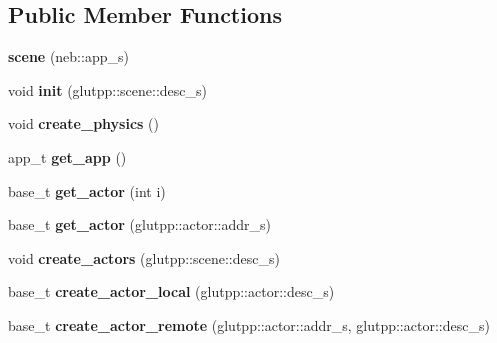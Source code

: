 \subsection*{Public Member Functions}
\begin{DoxyCompactItemize}
\item 
\hypertarget{classneb_1_1scene_1_1scene_abccb582576f45ce1b923bf6b6a153da6}{
{\bfseries scene} (neb::app\_\-s)}
\label{classneb_1_1scene_1_1scene_abccb582576f45ce1b923bf6b6a153da6}

\item 
\hypertarget{classneb_1_1scene_1_1scene_a44f7744f9e07ad6a8722689b3f8392b4}{
void {\bfseries init} (glutpp::scene::desc\_\-s)}
\label{classneb_1_1scene_1_1scene_a44f7744f9e07ad6a8722689b3f8392b4}

\item 
\hypertarget{classneb_1_1scene_1_1scene_a86d094b5dfff986da693d385c0f0f245}{
void {\bfseries create\_\-physics} ()}
\label{classneb_1_1scene_1_1scene_a86d094b5dfff986da693d385c0f0f245}

\item 
\hypertarget{classneb_1_1scene_1_1scene_a4a18d76291ad008be51b7fb8b22f1451}{
app\_\-t {\bfseries get\_\-app} ()}
\label{classneb_1_1scene_1_1scene_a4a18d76291ad008be51b7fb8b22f1451}

\item 
\hypertarget{classneb_1_1scene_1_1scene_a2d1b083bbbd21c78884713ae1b653ac7}{
base\_\-t {\bfseries get\_\-actor} (int i)}
\label{classneb_1_1scene_1_1scene_a2d1b083bbbd21c78884713ae1b653ac7}

\item 
\hypertarget{classneb_1_1scene_1_1scene_a6282e366a0709fe0cb7b9a3448695473}{
base\_\-t {\bfseries get\_\-actor} (glutpp::actor::addr\_\-s)}
\label{classneb_1_1scene_1_1scene_a6282e366a0709fe0cb7b9a3448695473}

\item 
\hypertarget{classneb_1_1scene_1_1scene_ad407feafc7a6378d8c05bbe7e0bd65df}{
void {\bfseries create\_\-actors} (glutpp::scene::desc\_\-s)}
\label{classneb_1_1scene_1_1scene_ad407feafc7a6378d8c05bbe7e0bd65df}

\item 
\hypertarget{classneb_1_1scene_1_1scene_a404da8d00ed2b2413f252c3b6bdd247b}{
base\_\-t {\bfseries create\_\-actor\_\-local} (glutpp::actor::desc\_\-s)}
\label{classneb_1_1scene_1_1scene_a404da8d00ed2b2413f252c3b6bdd247b}

\item 
\hypertarget{classneb_1_1scene_1_1scene_a2ab9588c62f0e93d53163a7363d4c3ad}{
base\_\-t {\bfseries create\_\-actor\_\-remote} (glutpp::actor::addr\_\-s, glutpp::actor::desc\_\-s)}
\label{classneb_1_1scene_1_1scene_a2ab9588c62f0e93d53163a7363d4c3ad}


\end{DoxyCompactItemize}
